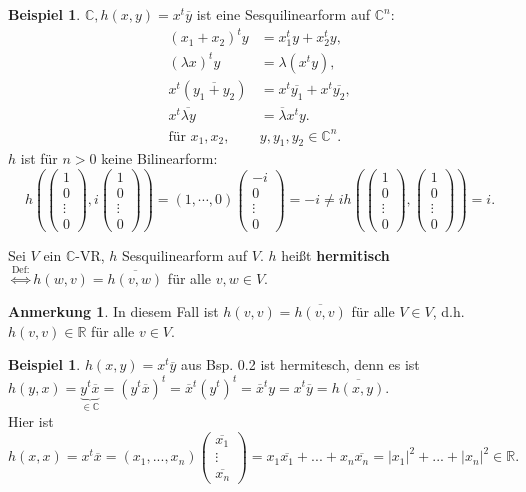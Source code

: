\documentclass[a4paper, titlepage]{article}
\theoremstyle{definition}
\newtheorem{bsp}[satz]{Beispiel}
\newtheorem*{anm}{Anmerkung}
\newcommand{\R}{\mathbb{R}}
\newcommand{\C}{\mathbb{C}}
\begin{document}
\begin{bsp}
	$\C, h(x,y) = x^t\overline{y} $ ist eine Sesquilinearform auf $\C^n:$
	\begin{align*}
	(x_1 + x_2)^ty &= x_{1}^ty+x_{2}^ty,\\
	(\lambda x)^{t}y &= \lambda(x^ty), \\
	x^t(\overline{y_1+y_2}) &= x^t\overline{y_1}+x^t\overline{y_2},\\
	 x^t \overline{\lambda y}&= \overline{\lambda} x^ty.\\
		\text{für } x_1, x_2,& y , y_1, y_2 \in \C^n.
	\end{align*}
	$h$ ist für $n>0$ keine Bilinearform: $$h(\begin{pmatrix} 1 \\ 0 \\ \vdots \\ 0 \end{pmatrix}
	, i\begin{pmatrix} 1 \\ 0 \\ \vdots \\ 0 \end{pmatrix}) = (1, \cdots, 0) \begin{pmatrix} -i \\ 0 \\ \vdots \\ 0 \end{pmatrix} = -i \neq ih(\begin{pmatrix} 1 \\ 0 \\ \vdots \\ 0 \end{pmatrix},\begin{pmatrix} 1 \\ 0 \\ \vdots \\ 0 \end{pmatrix}) = i.$$
\end{bsp}
\begin{definition}
    Sei $V $ ein $\C$-VR, $h$ Sesquilinearform auf $V$. $h$ heißt \textbf{hermitisch} $ \overset{\text{Def:}}{\Leftrightarrow} h(w,v) = \overline{h(v,w)}$ für alle $v,w \in V.$\\
\end{definition}
\begin{anm}
    In diesem Fall ist $h(v,v) = \overline{h(v,v)}$ für alle $V \in V$, d.h. $h(v,v) \in \R$ für alle $v\in V.$
\end{anm}
\begin{bsp}
	$h(x,y) = x^t\overline{y} $ aus Bsp. 0.2 ist hermitesch, denn es ist $h(y,x) =\underbrace{ y^t\overline{x}}_{\in \C}=(y^t\overline{x})^t = \overline{x}^t(y^t)^t = \overline{x}^ty= x^t \overline{y} = \overline{h(x,y)}.$\\
	Hier ist $h(x,x) = x^t\overline{x} = (x_1,...,x_n)\begin{pmatrix} \overline{x_1} \\  \vdots \\ \overline{x_n} \end{pmatrix} = x_1\overline{x_1} + ... +x_n \overline{x_n} = |x_1|^2 + ... + |x_n|^2 \in \R.$
\end{bsp}
\end{document}

